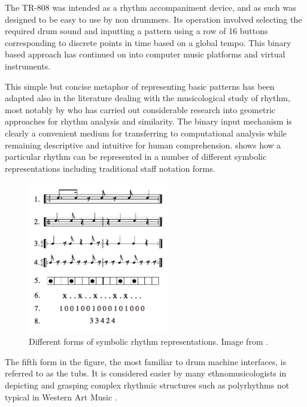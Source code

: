 The TR-808 was intended as a rhythm accompaniment device, and as such was designed to be easy to use by non drummers. Its operation involved selecting the required drum sound and inputting a pattern using a row of 16 buttons corresponding to discrete points in time based on a global tempo. This binary based approach has continued on into computer music platforms and virtual instruments. 


This simple but concise metaphor of representing basic patterns has been adapted also in the literature dealing with the musicological study of rhythm, most notably by \cite{Toussaint2013} who has carried out considerable research into geometric approaches for rhythm analysis and similarity. The binary input mechanism is clearly a convenient medium for transferring to computational analysis while remaining descriptive and intuitive for human comprehension.   shows how a particular rhythm can be represented in a number of different symbolic representations including traditional staff notation forms.

\begin{figure}
	\begin{center}
		\includegraphics[width=0.55\textwidth]{ch03_symbolic/figures/reps.png}
	\end{center}
	\caption[Different forms of symbolic rhythm representations]{Different forms of symbolic rhythm representations. Image from \citep{Toussaint2003}.}
	\label{fig:reps}
\end{figure}

The fifth form in the figure, the most familiar to drum machine interfaces, is referred to as the \acrfull{tubs}. It is considered easier by many ethnomusicologists in depicting and grasping complex rhythmic structures such as polyrhythms not typical in Western Art Music \citep{nzewi2008musical, koetting1970analysis}.  

